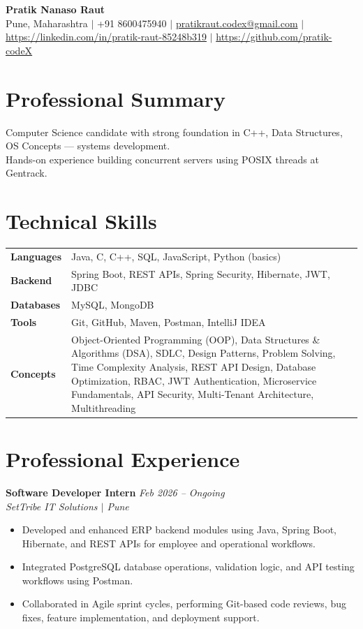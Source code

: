 \documentclass[10.5pt,a4paper]{article}
\begin{document}
\begin{center}
{\Large\bfseries Pratik Nanaso Raut}\\[2pt]
Pune, Maharashtra $|$ +91 8600475940 $|$ \href{mailto:pratikraut.codex@gmail.com}{pratikraut.codex@gmail.com} $|$ \href{https://linkedin.com/in/pratik-raut-85248b319}{https://linkedin.com/in/pratik-raut-85248b319} $|$ \href{https://github.com/pratik-codeX}{https://github.com/pratik-codeX}
\end{center}
\vspace{-2pt}
\section{Professional Summary}
Computer Science candidate with strong foundation in C++, Data Structures, OS Concepts — systems development.\\[2pt]
Hands-on experience building concurrent servers using POSIX threads at Gentrack.
\section{Technical Skills}
\begin{tabular}{@{}p{}p{}@{}}
\textbf{Languages} & Java, C, C++, SQL, JavaScript, Python (basics) \\[1pt]
\textbf{Backend} & Spring Boot, REST APIs, Spring Security, Hibernate, JWT, JDBC \\[1pt]
\textbf{Databases} & MySQL, MongoDB \\[1pt]
\textbf{Tools} & Git, GitHub, Maven, Postman, IntelliJ IDEA \\[1pt]
\textbf{Concepts} & Object-Oriented Programming (OOP), Data Structures \& Algorithms (DSA), SDLC, Design Patterns, Problem Solving, Time Complexity Analysis, REST API Design, Database Optimization, RBAC, JWT Authentication, Microservice Fundamentals, API Security, Multi-Tenant Architecture, Multithreading \\
\end{tabular}
\section{Professional Experience}
\textbf{Software Developer Intern} \hfill \textit{Feb 2026 -- Ongoing}
\\\textit{SetTribe IT Solutions $|$ Pune}
\begin{itemize}
  \item Developed and enhanced ERP backend modules using Java, Spring Boot, Hibernate, and REST APIs for employee and operational workflows.
  \item Integrated PostgreSQL database operations, validation logic, and API testing workflows using Postman.
  \item Collaborated in Agile sprint cycles, performing Git-based code reviews, bug fixes, feature implementation, and deployment support.
\end{itemize}
\end{document}
